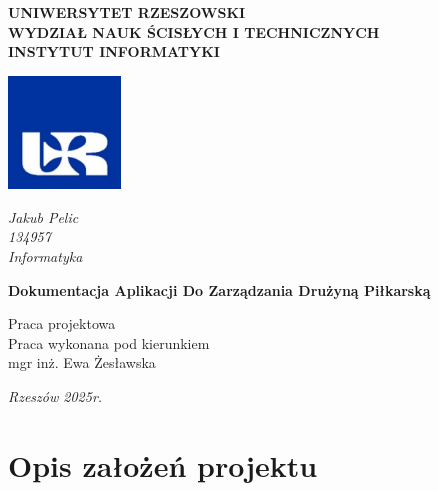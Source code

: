 \documentclass{urdpl}     %
\begin{document}
\begin{titlepage}
    \begin{flushleft}
        \textbf{UNIWERSYTET RZESZOWSKI}\\
        \textbf{WYDZIAŁ NAUK ŚCISŁYCH I TECHNICZNYCH}\\
        \textbf{INSTYTUT INFORMATYKI}
    \end{flushleft}
    
    \begin{flushright}
        \includegraphics[width=3cm]{logour.png}
    \end{flushright}

    \vspace{5cm}

    \begin{center}
        \textit{Jakub Pelic}\\
        \textit{134957}\\
        \textit{Informatyka}
    \end{center}
\vspace{2\baselineskip}
        \begin{center}
        \textbf{Dokumentacja Aplikacji Do Zarządzania Drużyną Piłkarską}\\
    \end{center}
    \vspace{2\baselineskip}

\begin{center}
    Praca projektowa \\
    Praca wykonana pod kierunkiem \\
    mgr inż. Ewa Żesławska
\end{center}

    \vfill

    \begin{center}
        \textit{Rzeszów 2025r.}
    \end{center}

\end{titlepage}

\tableofcontents

\chapter{Opis założeń projektu}
\end{document}
